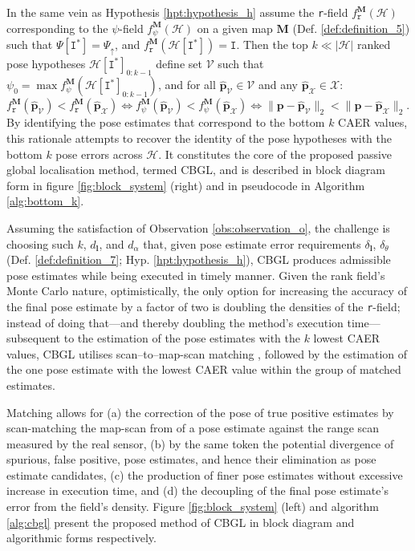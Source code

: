 In the same vein as Hypothesis \ref{hpt:hypothesis_h} assume the \texttt{r}-field
$f_{\texttt{r}}^{\bm{M}}(\mathcal{H})$ corresponding to the $\psi$-field
$f_{\psi}^{\bm{M}}(\mathcal{H})$ on a given map $\bm{M}$ (Def.
\ref{def:definition_5}) such that $\Psi[\texttt{I}^{\ast}] = \Psi_\uparrow$,
and $f_{\texttt{r}}^{\bm{M}}(\mathcal{H}[\texttt{I}^{\ast}]) = \texttt{I}$.
Then the top $k \ll |\mathcal{H}|$ ranked pose hypotheses
$\mathcal{H}[\texttt{I}^{\ast}]_{0:k-1}$ define set $\mathcal{V}$ such that
$\psi_0 = \max f_{\psi}^{\bm{M}}(\mathcal{H}[\texttt{I}^{\ast}]_{0:k-1})$,
and for all $\hat{\bm{p}}_\mathcal{V} \in \mathcal{V}$
and any $\hat{\bm{p}}_{\mathcal{X}} \in \mathcal{X}$:
$ f_{\texttt{r}}^{\bm{M}}(\hat{\bm{p}}_\mathcal{V}) < f_{\texttt{r}}^{\bm{M}}(\hat{\bm{p}}_{\mathcal{X}}) \Leftrightarrow
f_{\psi}^{\bm{M}}(\hat{\bm{p}}_\mathcal{V}) < f_{\psi}^{\bm{M}}(\hat{\bm{p}}_\mathcal{X}) \Leftrightarrow
\|\bm{p}-\hat{\bm{p}}_\mathcal{V}\|_2 < \|\bm{p}-\hat{\bm{p}}_{\mathcal{X}}\|_2$.
By identifying the pose estimates that correspond to the bottom $k$ CAER
values, this rationale attempts to recover the identity of the pose hypotheses
with the bottom $k$ pose errors across $\mathcal{H}$. It constitutes the core
of the proposed passive global localisation method, termed CBGL, and is
described
in block diagram form in figure \ref{fig:block_system} (right) and
in pseudocode in Algorithm \ref{alg:bottom_k}.

Assuming the satisfaction of Observation \ref{obs:observation_o}, the challenge
is choosing such $k$, $d_{\bm{l}}$, and $d_\alpha$ that, given pose estimate
error requirements $\delta_{\bm{l}}$, $\delta_{\theta}$ (Def.
\ref{def:definition_7}; Hyp.  \ref{hpt:hypothesis_h}), CBGL produces admissible
pose estimates while being executed in timely manner.  Given the rank field's
Monte Carlo nature, optimistically, the only option for increasing the accuracy
of the final pose estimate by a factor of two is doubling the densities of the
\texttt{r}-field; instead of doing that---and thereby doubling the method's
execution time---subsequent to the estimation of the pose estimates with the
$k$ lowest CAER values, CBGL utilises scan--to--map-scan matching
\cite{Vasiljevic2016c,Filotheou2023a}, followed by the estimation of the one
pose estimate with the lowest CAER value within the group of matched estimates.

Matching allows for (a) the correction of the pose of true positive estimates
by scan-matching the map-scan from of a pose
estimate against the range scan measured by the real sensor, (b) by the same
token the potential divergence of spurious, false positive, pose estimates, and
hence their elimination as pose estimate candidates, (c) the production of
finer pose estimates without excessive increase in execution time, and (d) the
decoupling of the final pose estimate's error from the field's density.
Figure \ref{fig:block_system} (left) and algorithm \ref{alg:cbgl} present the
proposed method of CBGL in block diagram and algorithmic forms respectively.

